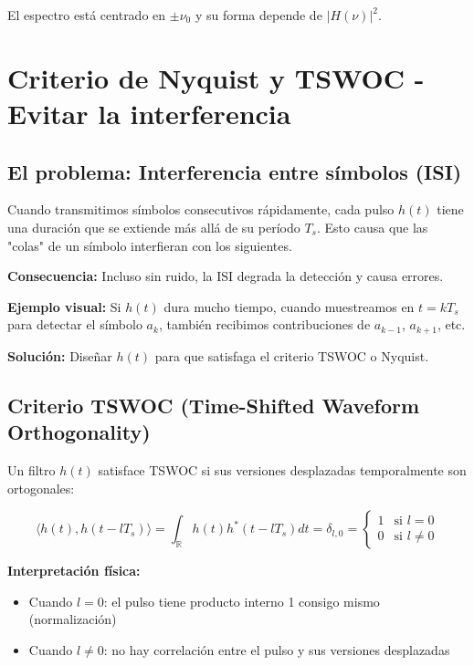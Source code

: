 \documentclass[10pt,a4paper]{article}
\begin{document}
El espectro está centrado en $\pm\nu_0$ y su forma depende de $|H(\nu)|^2$.

\section{Criterio de Nyquist y TSWOC - Evitar la interferencia}

\subsection{El problema: Interferencia entre símbolos (ISI)}

Cuando transmitimos símbolos consecutivos rápidamente, cada pulso $h(t)$ tiene una duración que se extiende más allá de su período $T_s$. Esto causa que las "colas" de un símbolo interfieran con los siguientes.

\textbf{Consecuencia:} Incluso sin ruido, la ISI degrada la detección y causa errores.

\textbf{Ejemplo visual:} Si $h(t)$ dura mucho tiempo, cuando muestreamos en $t = kT_s$ para detectar el símbolo $a_k$, también recibimos contribuciones de $a_{k-1}$, $a_{k+1}$, etc.

\textbf{Solución:} Diseñar $h(t)$ para que satisfaga el criterio TSWOC o Nyquist.

\subsection{Criterio TSWOC (Time-Shifted Waveform Orthogonality)}

\begin{tcolorbox}[colback=azulclaro!10,colframe=azuloscuro,title=Condición matemática]
Un filtro $h(t)$ satisface TSWOC si sus versiones desplazadas temporalmente son ortogonales:

$$\langle h(t), h(t-lT_s)\rangle = \int_{\mathbb{R}} h(t)h^*(t-lT_s)dt = \delta_{l,0} = \begin{cases}
1 & \text{si } l=0\\
0 & \text{si } l\neq 0
\end{cases}$$

\textbf{Interpretación física:}
\begin{itemize}
\item Cuando $l=0$: el pulso tiene producto interno 1 consigo mismo (normalización)
\item Cuando $l\neq 0$: no hay correlación entre el pulso y sus versiones desplazadas
\end{itemize}
\end{tcolorbox}
\end{document}
